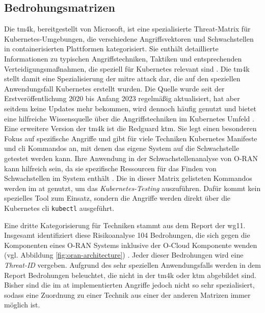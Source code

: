 \subsection{Bedrohungsmatrizen}
\par Die \gls{tm4k}, bereitgestellt von Microsoft, ist eine spezialisierte Threat-Matrix für Kubernetes-Umgebungen, die verschiedene Angriffsvektoren und Schwachstellen in containerisierten Plattformen kategorisiert. Sie enthält detaillierte Informationen zu typischen Angriffstechniken, Taktiken und entsprechenden Verteidigungsmaßnahmen, die speziell für Kubernetes relevant sind \autocite{TacticsThreatMatrix}. Die \gls{tm4k} stellt damit eine Spezialisierung der \gls{mitre} \gls{attack} dar, die auf den speziellen Anwendungsfall Kubernetes erstellt wurden. Die Quelle wurde seit der Erstveröffentlichung 2020 bis Anfang 2023 regelmäßig aktualisiert, hat aber seitdem keine Updates mehr bekommen, wird dennoch häufig genutzt und bietet eine hilfreiche Wissensquelle über die Angriffstechniken im Kubernetes Umfeld \autocite{DeploymentsMicrosoftThreatMatrixforKubernetes}. Eine erweitere Version der \gls{tm4k} ist die Redguard \gls{ktm}. Sie legt einen besonderen Fokus auf spezifische Angriffe und gibt für viele Techniken Kubernetes Manifeste und \gls{cli} Kommandos an, mit denen das eigene System auf die Schwachstelle getestet werden kann. Ihre Anwendung in der Schwachstellenanalyse von O-RAN kann hilfreich sein, da sie spezifische Ressourcen für das Finden von Schwachstellen im System enthält \autocite{KubernetesThreatMatrix}. Die in dieser Matrix gelisteten Kommandos werden im \gls{at} genutzt, um das \textit{Kubernetes-Testing} auszuführen. Dafür kommt kein spezielles Tool zum Einsatz, sondern die Angriffe werden direkt über die Kubernetes \gls{cli} \verb|kubectl| ausgeführt.
\par Eine dritte Kategorisierung für Techniken stammt aus dem Report der \orana{} \gls{wg11}. Insgesamt identifiziert diese Risikoanalyse 104 Bedrohungen, die sich gegen die Komponenten eines O-RAN Systems inklusive der O-Cloud Komponente wenden (vgl. Abbildung \ref{fig:oran-architecture}) \autocite{o-ranworkgroup11securityworkgroupORANSecurityThreat2024}. Jeder dieser Bedrohungen wird eine \textit{Threat-ID} vergeben. Aufgrund des sehr speziellen Anwendungsfalls werden in dem Report Bedrohungen beleuchtet, die nicht in der \gls{tm4k} oder \gls{ktm} abgebildet sind. Bisher sind die im \gls{at} implementierten Angriffe jedoch nicht so sehr spezialisiert, sodass eine Zuordnung zu einer Technik aus einer der anderen Matrizen immer möglich ist.
